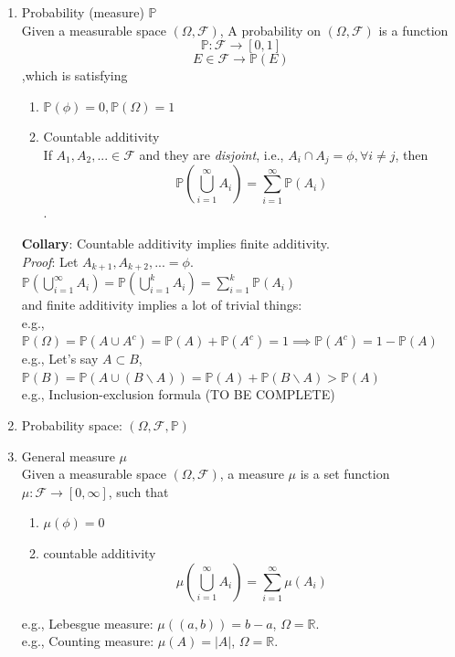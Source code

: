 \documentclass[11pt]{article}
\begin{document}
\begin{enumerate}
\item Probability (measure) $\mathbb{P}$\\
Given a measurable space $(\Omega , \mathcal{F})$, A probability on $(\Omega , \mathcal{F})$ is a function $$\mathbb{P}: \mathcal{F} \rightarrow [0, 1]$$$$E\in \mathcal{F} \rightarrow \mathbb{P}(E)$$
,which is satisfying \begin{enumerate}
\item $\mathbb{P}(\phi)=0, \mathbb{P}(\Omega )=1$
\item Countable additivity\\
If $A_1 ,A_2 ,... \in \mathcal{F}$ and they are \emph{disjoint}, i.e., $A_i \cap A_j = \phi, \forall i \neq j$, then $$\mathbb{P}(\bigcup_{i=1}^{\infty}A_i)=\sum_{i=1}^{\infty} \mathbb{P}(A_i)$$.
\end{enumerate}
\textbf{Collary}: Countable additivity implies finite additivity.\\
\textit{Proof}: Let $A_{k+1} ,A_{k+2} ,... = \phi$. $\mathbb{P}(\bigcup_{i=1}^{\infty}A_i) = \mathbb{P}(\bigcup_{i=1}^{k}A_i)=\sum_{i=1}^{k} \mathbb{P}(A_i)$\\
and finite additivity implies a lot of trivial things:\\
e.g., $\mathbb{P}(\Omega)=\mathbb{P}(A \cup A^c)=\mathbb{P}(A)+\mathbb{P}(A^c)=1 \implies \mathbb{P}(A^c)=1-\mathbb{P}(A)$\\
e.g., Let's say $A \subset B$, $\mathbb{P}(B)=\mathbb{P}(A\cup(B \backslash A))=\mathbb{P}(A)+\mathbb{P}(B \backslash A) > \mathbb{P}(A)$\\
e.g., Inclusion-exclusion formula (TO BE COMPLETE)

\item Probability space: $(\Omega , \mathcal{F}, \mathbb{P})$\\

\item General measure $\mu$\\
Given a measurable space $(\Omega ,\mathcal{F})$, a measure $\mu$ is a set function $\mu : \mathcal{F} \rightarrow [0, \infty]$, such that
\begin{enumerate}
\item $\mu (\phi)=0$
\item countable additivity $$\mu (\bigcup_{i=1}^{\infty}A_i)=\sum_{i=1}^{\infty} \mu (A_i)$$
\end{enumerate}
e.g., Lebesgue measure: $\mu ((a, b)) = b-a$, $\Omega
= \mathbb{R}$.\\
e.g., Counting measure: $\mu (A)= |A|$, $\Omega
= \mathbb{R}$.\\


\end{enumerate}
\end{document}
